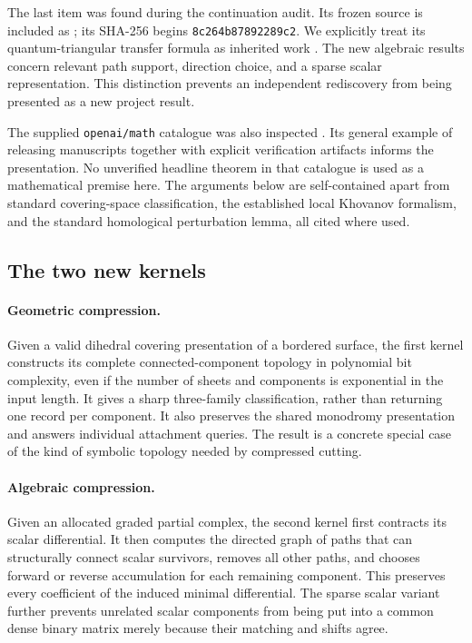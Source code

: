 The last item was found during the continuation audit. Its frozen
source is included as ; its
SHA-256 begins \texttt{8c264b87892289c2}. We explicitly treat its
quantum-triangular transfer formula as inherited work
\cite{TriangularDraft2026}. The new algebraic results concern relevant
path support, direction choice, and a sparse scalar representation.
This distinction prevents an independent rediscovery from being
presented as a new project result.

The supplied \texttt{openai/math} catalogue was also inspected
\cite{OpenAIMath2026}. Its general example of releasing manuscripts
together with explicit verification artifacts informs the presentation.
No unverified headline theorem in that catalogue is used as a
mathematical premise here. The arguments below are self-contained
apart from standard covering-space classification, the established
local Khovanov formalism, and the standard homological perturbation
lemma, all cited where used.

\subsection{The two new kernels}

\paragraph{Geometric compression.}
Given a valid dihedral covering presentation of a bordered surface, the
first kernel constructs its complete connected-component topology in
polynomial bit complexity, even if the number of sheets and components
is exponential in the input length. It gives a sharp three-family
classification, rather than returning one record per component.
It also preserves the shared monodromy presentation and answers
individual attachment queries. The result is a concrete special case
of the kind of symbolic topology needed by compressed cutting.

\paragraph{Algebraic compression.}
Given an allocated graded partial complex, the second kernel first
contracts its scalar differential. It then computes the directed graph
of paths that can structurally connect scalar survivors, removes all
other paths, and chooses forward or reverse accumulation for each
remaining component. This preserves every coefficient of the induced
minimal differential. The sparse scalar variant further prevents
unrelated scalar components from being put into a common dense binary
matrix merely because their matching and shifts agree.

